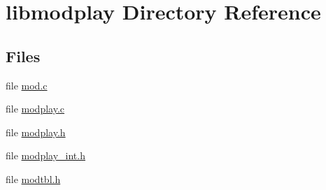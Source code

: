 \hypertarget{dir_000007}{}\section{libmodplay Directory Reference}
\label{dir_000007}
\subsection*{Files}
\begin{DoxyCompactItemize}
\item 
file \hyperlink{mod_8c}{mod.\+c}
\item 
file \hyperlink{modplay_8c}{modplay.\+c}
\item 
file \hyperlink{modplay_8h}{modplay.\+h}
\item 
file \hyperlink{modplay__int_8h}{modplay\+\_\+int.\+h}
\item 
file \hyperlink{modtbl_8h}{modtbl.\+h}
\end{DoxyCompactItemize}
